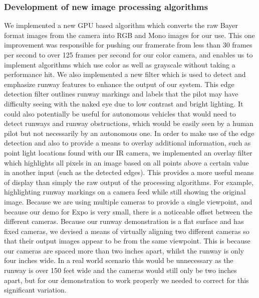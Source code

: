 \documentclass[letterpaper,10pt,titlepage]{IEEEtran}
\begin{document}
    \subsubsection{Development of new image processing algorithms}
        We implemented a new GPU based algorithm which converts the raw Bayer format images from the camera into RGB and Mono images for our use. This one improvement was responsible for pushing our framerate from less than 30 frames per second to over 125 frames per second for our color camera, and enables us to implement algorithms which use color as well as grayscale without taking a performance hit.
        We also implemented a new filter which is used to detect and emphasize runway features to enhance the output of our system. This edge detection filter outlines runway markings and labels that the pilot may have difficulty seeing with the naked eye due to low contrast and bright lighting. It could also potentially be useful for autonomous vehicles that would need to detect runways and runway obstructions, which would be easily seen by a human pilot but not necessarily by an autonomous one.
        In order to make use of the edge detection and also to provide a means to overlay additional information, such as point light locations found with our IR camera, we implemented an overlay filter which highlights all pixels in an image based on all points above a certain value in another input (such as the detected edges). This provides a more useful means of display than simply the raw output of the processing algorithms. For example, highlighting runway markings on a camera feed while still showing the original image.
        Because we are using multiple cameras to provide a single viewpoint, and because our demo for Expo is very small, there is a noticeable offset between the different cameras. Because our runway demonstration is a flat surface and has fixed cameras, we devised a means of virtually aligning two different cameras so that their output images appear to be from the same viewpoint. This is because our cameras are spaced more than two inches apart, whilst the runway is only four inches wide. In a real world scenario this would be unnecessary as the runway is over 150 feet wide and the cameras would still only be two inches apart, but for our demonstration to work properly we needed to correct for this significant variation. 
\end{document}
